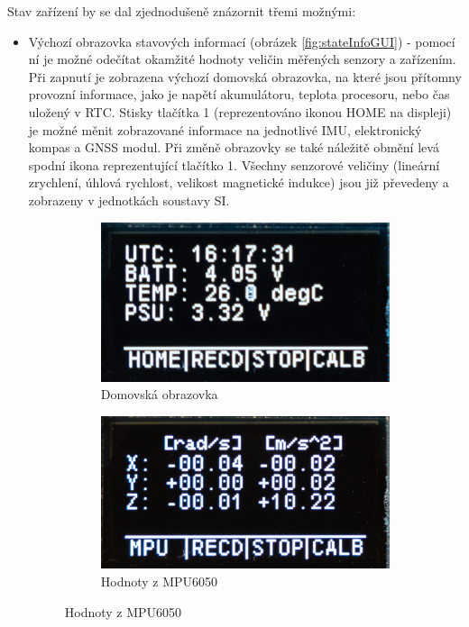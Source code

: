 Stav zařízení by se dal zjednodušeně znázornit třemi možnými:
\begin{itemize}
\item Výchozí obrazovka stavových informací (obrázek \ref{fig:stateInfoGUI}) - pomocí ní je možné odečítat okamžité hodnoty veličin měřených senzory a zařízením. Při zapnutí je zobrazena výchozí domovská obrazovka, na které jsou přítomny provozní informace, jako je napětí akumulátoru, teplota procesoru, nebo čas uložený v RTC. Stisky tlačítka 1 (reprezentováno ikonou HOME na displeji) je možné měnit zobrazované informace na jednotlivé IMU, elektronický kompas a GNSS modul. Při změně obrazovky se také náležitě obmění levá spodní ikona reprezentující tlačítko 1. Všechny senzorové veličiny (lineární zrychlení, úhlová rychlost, velikost magnetické indukce) jsou již převedeny a zobrazeny v jednotkách soustavy SI.
\begin{figure}[h]
     \centering
     \begin{subfigure}[b]{0.29\textwidth}
         \centering
         \includegraphics[width=\textwidth]{obrazky/menuHome2}
         \caption{Domovská obrazovka}
       
     \end{subfigure}
     \hfill
     \centering
     \begin{subfigure}[b]{0.29\textwidth}
         \centering
         \includegraphics[width=\textwidth]{obrazky/menuMPU}
         \caption{Hodnoty z MPU6050}
         

\end{subfigure}
\end{figure}
\end{itemize}
